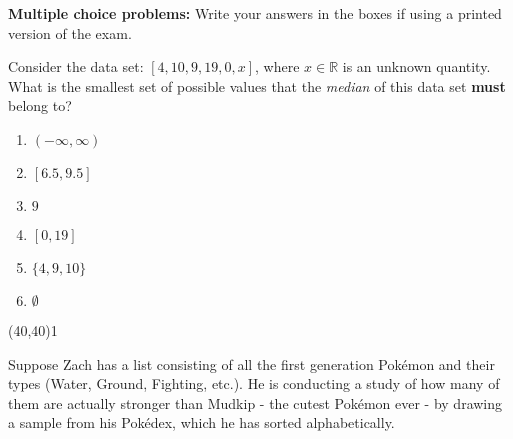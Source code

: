\documentclass[addpoints]{exam}
\def\solutions{0}
\begin{document}
{\renewcommand{\arraystretch}{1.5}

\vspace{8mm}



\label{---Problems---}


\vspace{3cm}

{\begin{center} {\bf Multiple choice problems:} Write your answers in the boxes if using a printed version of the exam. \end{center}}\vspace{2mm}

\begin{questions}
\question[3] Consider the data set:  $[4, 10, 9, 19, 0, x]$, where $x \in \mathbb{R}$ is an unknown quantity. What is the smallest set of possible values that the \textit{median} of this data set \textbf{must} belong to?
\vspace{2mm}

\begin{minipage}[b]{.85\textwidth}
	\begin{enumerate}[label=\Alph*.]
		\item $(-\infty, \infty)$
		\item $[6.5,9.5]$
		\item $9$
		\item $[0,19]$
		\item $\{4,9,10\}$
		\item $\emptyset$
	\end{enumerate}
\end{minipage}
\begin{minipage}[b]{.1\textwidth}
	\vspace{\fill}\framebox(40,40){\if\solutions1 \fi}
\end{minipage}

\question[3]  Suppose Zach has a list consisting of all the first generation Pok\'emon and their types (Water, Ground, Fighting, etc.). He is conducting a study of how many of them are actually stronger than Mudkip - the cutest Pok\'emon ever - by drawing a sample from his Pok\'edex, which he has sorted alphabetically.


\end{questions}}
\end{document}
